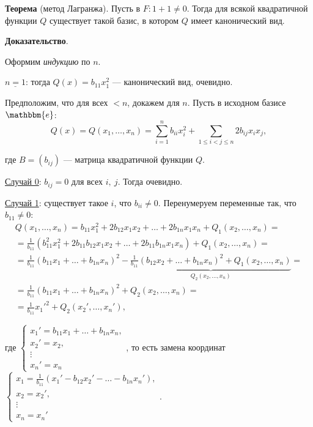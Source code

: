 \documentclass[a4paper, 12pt]{article}
\newcommand{\me}{\mathbbm{e}}
\begin{document}
\textbf{Теорема} (метод Лагранжа). Пусть в $F: 1 + 1 \neq 0$. Тогда для всякой квадратичной функции $Q$ существует такой базис, в котором $Q$ имеет канонический вид.

\textbf{Доказательство}.

Оформим \textit{индукцию} по $n$.

$\underline{n = 1}$: тогда $Q(x) = b_{11}x_1^2$ --- канонический вид, очевидно.

Предположим, что для всех $< n$, докажем для $n$. Пусть в исходном базисе $\me$:
\vspace{-3mm}
\[
Q(x) = Q(x_1, \ldots, x_n) = \sum_{i = 1}^{n}b_{ii}x_i^2 + \sum_{1 \leqslant i < j \leqslant n}2b_{ij}x_ix_j,
\]

\vspace{-3mm}
где $B = (b_{ij})$ --- матрица квадратичной функции $Q$.

\vspace{3mm}
\underline{Случай 0}: $b_{ij} = 0$ для всех $i,\ j$. Тогда очевидно.

\vspace{3mm}
\underline{Случай 1}: существует такое $i$, что $b_{ii} \neq 0$. Перенумеруем переменные так, что $b_{11} \neq 0$:
\vspace{-3mm}
\begin{gather*}
Q(x_1, \ldots, x_n) = b_{11}x_1^2 + 2b_{12}x_1x_2 + \ldots + 2b_{1n}x_1x_n + Q_1(x_2, \ldots, x_n) = \\ = \frac{1}{b_{11}}(b_{11}^2x_1^2 + 2b_{11}b_{12}x_1x_2 + \ldots + 2b_{11}b_{1n}x_1x_n) + Q_1(x_2, \ldots, x_n) = \\ = \frac{1}{b_{11}}(b_{11}x_1 + \ldots + b_{1n}x_n)^2 - \underbrace{\frac{1}{b_{11}}(b_{12}x_2 + \ldots + b_{1n}x_n)^2 + Q_1(x_2, \ldots, x_n)}_{Q_2(x_2, \ldots, x_n)} = \\ = \frac{1}{b_{11}}(b_{11}x_1 + \ldots + b_{1n}x_n)^2 + Q_2(x_2, \ldots, x_n) = \\ = \frac{1}{b_{11}}x_1'^2 + Q_2(x_2', \ldots, x_n'),
\end{gather*}

\vspace{-3mm}
где
$
\begin{cases*}
x_1' = b_{11}x_1 + \ldots + b_{1n}x_n, \\
x_2' = x_2, \\[-0.5em]
\vdots \\[-0.5em]
x_n' = x_n
\end{cases*}
$, то есть замена координат
$
\begin{cases*}
x_1 = \frac{1}{b_{11}}(x_1' - b_{12}x_2' - \ldots - b_{1n}x_n'), \\
x_2 = x_2', \\[-0.5em]
\vdots \\[-0.5em]
x_n = x_n'
\end{cases*}
$.
\end{document}
